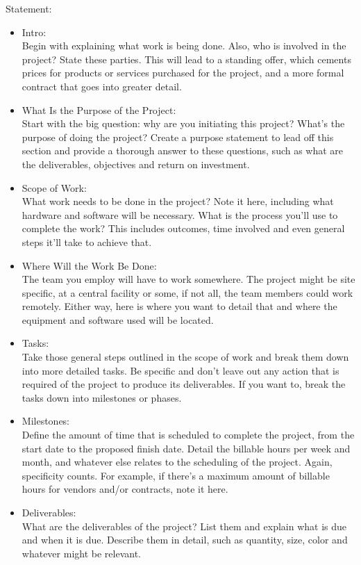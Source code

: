 \documentclass{article}
\begin{document}
Statement:
\begin{itemize}
  \item Intro:\\ Begin with explaining what work is being done. Also, who is involved in the project? State these parties. This will lead to a standing offer, which cements prices for products or services purchased for the project, and a more formal contract that goes into greater detail.
  \item  What Is the Purpose of the Project:\\ Start with the big question: why are you initiating this project? What’s the purpose of doing the project? Create a purpose statement to lead off this section and provide a thorough answer to these questions, such as what are the deliverables, objectives and return on investment.
  \item  Scope of Work:\\ What work needs to be done in the project? Note it here, including what hardware and software will be necessary. What is the process you’ll use to complete the work? This includes outcomes, time involved and even general steps it’ll take to achieve that.
  \item  Where Will the Work Be Done:\\ The team you employ will have to work somewhere. The project might be site specific, at a central facility or some, if not all, the team members could work remotely. Either way, here is where you want to detail that and where the equipment and software used will be located.
  \item  Tasks:\\ Take those general steps outlined in the scope of work and break them down into more detailed tasks. Be specific and don’t leave out any action that is required of the project to produce its deliverables. If you want to, break the tasks down into milestones or phases.
  \item  Milestones:\\ Define the amount of time that is scheduled to complete the project, from the start date to the proposed finish date. Detail the billable hours per week and month, and whatever else relates to the scheduling of the project. Again, specificity counts. For example, if there’s a maximum amount of billable hours for vendors and/or contracts, note it here.
  \item  Deliverables:\\ What are the deliverables of the project? List them and explain what is due and when it is due. Describe them in detail, such as quantity, size, color and whatever might be relevant.

\end{itemize}
\end{document}
